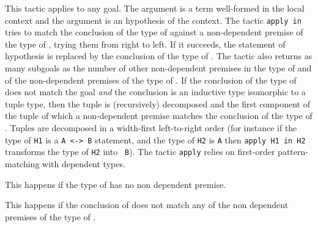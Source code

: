 This tactic applies to any goal.  The argument {\term} is a term
well-formed in the local context and the argument {\ident} is an
hypothesis of the context.  The tactic {\tt apply {\term} in {\ident}}
tries to match the conclusion of the type of {\ident} against a
non-dependent premise of the type of {\term}, trying them from right to
left.  If it succeeds, the statement of hypothesis {\ident} is
replaced by the conclusion of the type of {\term}. The tactic also
returns as many subgoals as the number of other non-dependent premises
in the type of {\term} and of the non-dependent premises of the type
of {\ident}.  If the conclusion of the type of {\term} does not match
the goal {\em and} the conclusion is an inductive type isomorphic to a
tuple type, then the tuple is (recursively) decomposed and the first
component of the tuple of which a non-dependent premise matches the
conclusion of the type of {\ident}. Tuples are decomposed in a
width-first left-to-right order (for instance if the type of {\tt H1}
is a \verb=A <-> B= statement, and the type of {\tt H2} is \verb=A=
then {\tt apply H1 in H2} transforms the type of {\tt H2} into {\tt
  B}). The tactic {\tt apply} relies on first-order pattern-matching
with dependent types.

\begin{ErrMsgs}
\item {}

This happens if the type of {\term} has no non dependent premise.

\item {}

This happens if the conclusion of {\ident} does not match any of the
non dependent premises of the type of {\term}.
\end{ErrMsgs}

